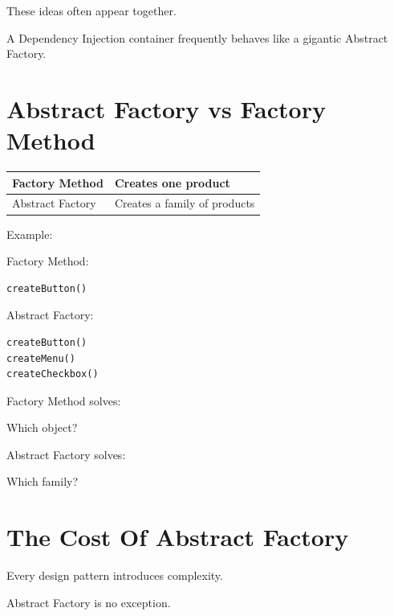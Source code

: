 \documentclass[11pt,a4paper]{book}
\begin{document}
These ideas often appear together.

A Dependency Injection container frequently behaves like
a gigantic Abstract Factory.


\section{Abstract Factory vs Factory Method}

\begin{center}
\begin{tabular}{p{5cm} p{8cm}}
\toprule
Factory Method &
Creates one product \\
\midrule
Abstract Factory &
Creates a family of products \\
\bottomrule
\end{tabular}
\end{center}

Example:

Factory Method:

\begin{verbatim}
createButton()
\end{verbatim}

Abstract Factory:

\begin{verbatim}
createButton()
createMenu()
createCheckbox()
\end{verbatim}

\begin{rosettarule}

Factory Method solves:

Which object?

Abstract Factory solves:

Which family?

\end{rosettarule}


\section{The Cost Of Abstract Factory}

\begin{trap}

Every design pattern introduces complexity.

Abstract Factory is no exception.

\end{trap}
\end{document}
